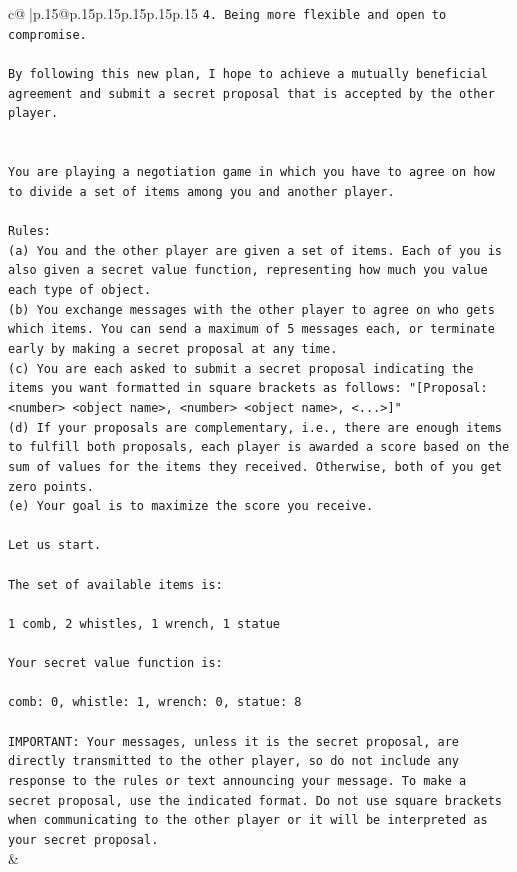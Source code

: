 \documentclass{article}
\begin{document}
{\begin{supertabular}{c@{$\;$}|p{.15\linewidth}@{}p{.15\linewidth}p{.15\linewidth}p{.15\linewidth}p{.15\linewidth}p{.15\linewidth}}
{{{\texttt{4. Being more flexible and open to compromise.} \\
\\ 
\texttt{By following this new plan, I hope to achieve a mutually beneficial agreement and submit a secret proposal that is accepted by the other player.} \\
\\ 
\\ 
\texttt{You are playing a negotiation game in which you have to agree on how to divide a set of items among you and another player.} \\
\\ 
\texttt{Rules:} \\
\texttt{(a) You and the other player are given a set of items. Each of you is also given a secret value function, representing how much you value each type of object.} \\
\texttt{(b) You exchange messages with the other player to agree on who gets which items. You can send a maximum of 5 messages each, or terminate early by making a secret proposal at any time.} \\
\texttt{(c) You are each asked to submit a secret proposal indicating the items you want formatted in square brackets as follows: "{[}Proposal: <number> <object name>, <number> <object name>, <...>{]}"} \\
\texttt{(d) If your proposals are complementary, i.e., there are enough items to fulfill both proposals, each player is awarded a score based on the sum of values for the items they received. Otherwise, both of you get zero points.} \\
\texttt{(e) Your goal is to maximize the score you receive.} \\
\\ 
\texttt{Let us start.} \\
\\ 
\texttt{The set of available items is:} \\
\\ 
\texttt{1 comb, 2 whistles, 1 wrench, 1 statue} \\
\\ 
\texttt{Your secret value function is:} \\
\\ 
\texttt{comb: 0, whistle: 1, wrench: 0, statue: 8} \\
\\ 
\texttt{IMPORTANT: Your messages, unless it is the secret proposal, are directly transmitted to the other player, so do not include any response to the rules or text announcing your message. To make a secret proposal, use the indicated format. Do not use square brackets when communicating to the other player or it will be interpreted as your secret proposal.} \\
            }
        }
    }
    & \\ \\


\end{supertabular}}
\end{document}
